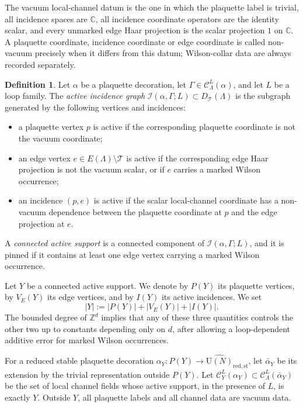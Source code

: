 \documentclass[11pt,a4paper,reqno]{amsart}
\theoremstyle{definition}
\newtheorem{definition}[theorem]{Definition}
\theoremstyle{remark}
\newcommand\U{{\mathrm U}}
\newcommand\Z{{\mathbb{Z}}}
\newcommand\C{{\mathbb C}}
\begin{document}
The vacuum local-channel datum is the one in which the plaquette label is trivial, all incidence spaces are $\C$, all incidence coordinate operators are the identity scalar, and every unmarked edge Haar projection is the scalar projection $1$ on $\C$.  A plaquette coordinate, incidence coordinate or edge coordinate is called non-vacuum precisely when it differs from this datum; Wilson-collar data are always recorded separately.

\begin{definition}\label{def:active-support}
Let $\alpha$ be a plaquette decoration, let $\Gamma\in\mathcal C_\Lambda^L(\alpha)$, and let $L$ be a loop family. The \emph{active incidence graph} $\mathcal I(\alpha,\Gamma;L)\subset D_{\mathcal T}(\Lambda)$ is the subgraph generated by the following vertices and incidences:
\begin{itemize}
\item a plaquette vertex $p$ is active if the corresponding plaquette coordinate is not the vacuum coordinate;
\item an edge vertex $e\in E(\Lambda)\setminus\mathcal T$ is active if the corresponding edge Haar projection is not the vacuum scalar, or if $e$ carries a marked Wilson occurrence;
\item an incidence $(p,e)$ is active if the scalar local-channel coordinate has a non-vacuum dependence between the plaquette coordinate at $p$ and the edge projection at $e$.
\end{itemize}
A \emph{connected active support} is a connected component of $\mathcal I(\alpha,\Gamma;L)$, and it is pinned if it contains at least one edge vertex carrying a marked Wilson occurrence.

Let $Y$ be a connected active support.  We denote by $P(Y)$ its plaquette vertices, by $V_E(Y)$ its edge vertices, and by $I(Y)$ its active incidences.  We set
\[
|Y|:=|P(Y)|+|V_E(Y)|+|I(Y)|.
\]
The bounded degree of $\Z^d$ implies that any of these three quantities controls the other two up to constants depending only on $d$, after allowing a loop-dependent additive error for marked Wilson occurrences.
\end{definition}

For a reduced stable plaquette decoration $\alpha_Y:P(Y)\to\widehat{\U(N)}_{\mathrm{red},\mathrm{st}}$, let $\bar\alpha_Y$ be its extension by the trivial representation outside $P(Y)$. Let $\mathcal C_Y^L(\alpha_Y)\subset\mathcal C_\Lambda^L(\bar\alpha_Y)$ be the set of local channel fields whose active support, in the presence of $L$, is exactly $Y$. Outside $Y$, all plaquette labels and all channel data are vacuum data.
\end{document}
